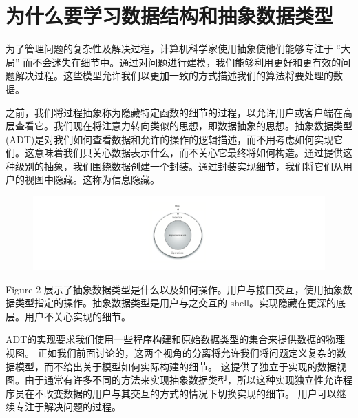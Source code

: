 \section{为什么要学习数据结构和抽象数据类型}
\begin{frame}\ft{\secname}
为了管理问题的复杂性及解决过程，计算机科学家使用抽象使他们能够专注于 “大局” 而不会迷失在细节中。通过对问题进行建模，我们能够利用更好和更有效的问题解决过程。这些模型允许我们以更加一致的方式描述我们的算法将要处理的数据。
\end{frame}

\begin{frame}\ft{\secname}
之前，我们将过程抽象称为隐藏特定函数的细节的过程，以允许用户或客户端在高层查看它。我们现在将注意力转向类似的思想，即数据抽象的思想。抽象数据类型(ADT)是对我们如何查看数据和允许的操作的逻辑描述，而不用考虑如何实现它们。这意味着我们只关心数据表示什么，而不关心它最终将如何构造。通过提供这种级别的抽象，我们围绕数据创建一个封装。通过封装实现细节，我们将它们从用户的视图中隐藏。这称为信息隐藏。
\end{frame}

\begin{frame}\ft{\secname}

\begin{figure}[htbp]
  \centering
  \includegraphics[width=6in]{images/ds_adt.png}
\end{figure}

Figure 2 展示了抽象数据类型是什么以及如何操作。用户与接口交互，使用抽象数据类型指定的操作。抽象数据类型是用户与之交互的 shell。实现隐藏在更深的底层。用户不关心实现的细节。 
\end{frame}

\begin{frame}\ft{\secname}
ADT的实现要求我们使用一些程序构建和原始数据类型的集合来提供数据的物理视图。 正如我们前面讨论的，这两个视角的分离将允许我们将问题定义复杂的数据模型，而不给出关于模型如何实际构建的细节。 这提供了独立于实现的数据视图。由于通常有许多不同的方法来实现抽象数据类型，所以这种实现独立性允许程序员在不改变数据的用户与其交互的方式的情况下切换实现的细节。 用户可以继续专注于解决问题的过程。
\end{frame}

